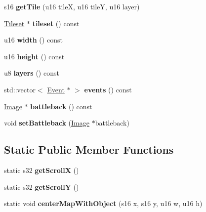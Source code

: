 \begin{DoxyCompactItemize}
\item 
\hypertarget{classMap_a69a3d15b2e2223f7769ea4cab96cf9a7}{s16 {\bfseries get\-Tile} (u16 tile\-X, u16 tile\-Y, u16 layer)}\label{classMap_a69a3d15b2e2223f7769ea4cab96cf9a7}

\item 
\hypertarget{classMap_a18f14d389c84ca7d8f75a0a31fdf35f7}{\hyperlink{structTileset}{Tileset} $\ast$ {\bfseries tileset} () const }\label{classMap_a18f14d389c84ca7d8f75a0a31fdf35f7}

\item 
\hypertarget{classMap_aacc053785e87444e9232f7684686cb8f}{u16 {\bfseries width} () const }\label{classMap_aacc053785e87444e9232f7684686cb8f}

\item 
\hypertarget{classMap_a98253eaaf510d7de3f93c24c4dad96e3}{u16 {\bfseries height} () const }\label{classMap_a98253eaaf510d7de3f93c24c4dad96e3}

\item 
\hypertarget{classMap_adb7a36450acd05a790c04b70c13474ee}{u8 {\bfseries layers} () const }\label{classMap_adb7a36450acd05a790c04b70c13474ee}

\item 
\hypertarget{classMap_a40596b9dde8ddb9695b2e5bdc52417b4}{std\-::vector$<$ \hyperlink{classEvent}{Event} $\ast$ $>$ {\bfseries events} () const }\label{classMap_a40596b9dde8ddb9695b2e5bdc52417b4}

\item 
\hypertarget{classMap_ae26f0592f4a8f5503801afe4362db6c9}{\hyperlink{classImage}{Image} $\ast$ {\bfseries battleback} () const }\label{classMap_ae26f0592f4a8f5503801afe4362db6c9}

\item 
\hypertarget{classMap_ada9f5917144006f3f732435aefd2aa83}{void {\bfseries set\-Battleback} (\hyperlink{classImage}{Image} $\ast$battleback)}\label{classMap_ada9f5917144006f3f732435aefd2aa83}

\end{DoxyCompactItemize}
\subsection*{Static Public Member Functions}
\begin{DoxyCompactItemize}
\item 
\hypertarget{classMap_a2f4ff64ef6f3ed89e317ec975b4fdc10}{static s32 {\bfseries get\-Scroll\-X} ()}\label{classMap_a2f4ff64ef6f3ed89e317ec975b4fdc10}

\item 
\hypertarget{classMap_acbb4890c88051aa441ad7f5211aa63a4}{static s32 {\bfseries get\-Scroll\-Y} ()}\label{classMap_acbb4890c88051aa441ad7f5211aa63a4}

\item 
\hypertarget{classMap_a62675cd66f25e784a7abd6e40ec2dee7}{static void {\bfseries center\-Map\-With\-Object} (s16 x, s16 y, u16 w, u16 h)}\label{classMap_a62675cd66f25e784a7abd6e40ec2dee7}

\end{DoxyCompactItemize}
